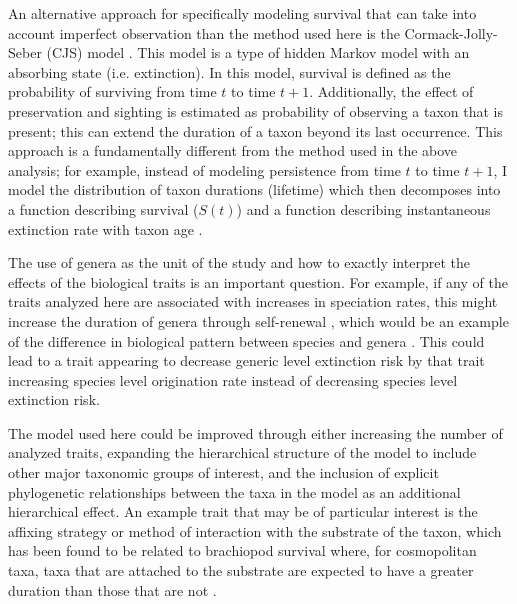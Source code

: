 \documentclass{article}
\begin{document}
An alternative approach for specifically modeling survival that can take into account imperfect observation than the method used here is the Cormack-Jolly-Seber (CJS) model \citep{Royle2008,Liow2008,Tomiya2013,Liow2010b}. This model is a type of hidden Markov model with an absorbing state (i.e. extinction). In this model, survival is defined as the probability of surviving from time \(t\) to time \(t + 1\). Additionally, the effect of preservation and sighting is estimated as probability of observing a taxon that is present; this can extend the duration of a taxon beyond its last occurrence. This approach is a fundamentally different from the method used in the above analysis; for example, instead of modeling persistence from time \(t\) to time \(t + 1\), I model the distribution of taxon durations (lifetime) which then decomposes into a function describing survival (\(S(t)\)) and a function describing instantaneous extinction rate with taxon age \citep{Klein2003,Royle2008}. 


The use of genera as the unit of the study and how to exactly interpret the effects of the biological traits is an important question. For example, if any of the traits analyzed here are associated with increases in speciation rates, this might increase the duration of genera through self-renewal \citep{Raup1991b,Raup1994}, which would be an example of the difference in biological pattern between species and genera \citep{Jablonski1987,Jablonski2007,Jablonski2008a}. This could lead to a trait appearing to decrease generic level extinction risk by that trait increasing species level origination rate instead of decreasing species level extinction risk. %

The model used here could be improved through either increasing the number of analyzed traits, expanding the hierarchical structure of the model to include other major taxonomic groups of interest, and the inclusion of explicit phylogenetic relationships between the taxa in the model as an additional hierarchical effect. An example trait that may be of particular interest is the affixing strategy or method of interaction with the substrate of the taxon, which has been found to be related to brachiopod survival where, for cosmopolitan taxa, taxa that are attached to the substrate are expected to have a greater duration than those that are not \citep{Alexander1977}.
\end{document}
